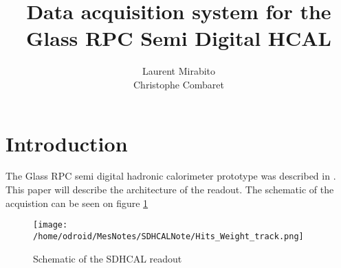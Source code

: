 \documentclass[english]{article}
\title{\textbf{Data acquisition system for the Glass RPC Semi Digital HCAL}}
\author{Laurent Mirabito\\
		Christophe Combaret\\
		}
\date{}
\begin{document}
\maketitle

\section{Introduction}

The Glass RPC semi digital hadronic calorimeter prototype was described in \cite{RPC-paper}. This paper will describe the architecture of the readout. The schematic of the acquistion can be seen on figure \ref{daq-schematic}


\begin{figure}[htp]
\centering
\texttt{[image: /home/odroid/MesNotes/SDHCALNote/Hits\_Weight\_track.png]}
\caption{Schematic of the SDHCAL readout}
\label{daq-schematic}
\end{figure}
\end{document}
